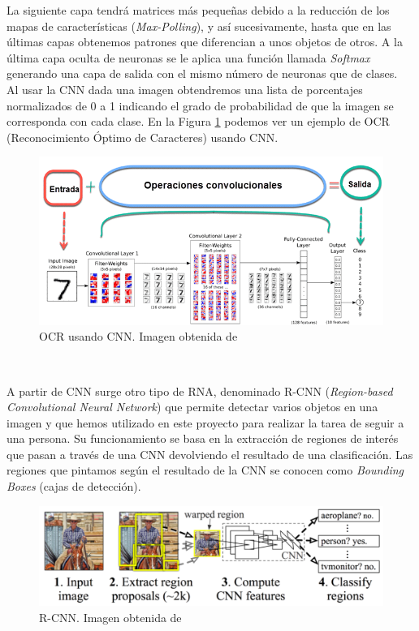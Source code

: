 La siguiente capa tendrá matrices más pequeñas debido a la reducción de los mapas de características (\textit{Max-Polling}), y así sucesivamente, hasta que en las últimas capas obtenemos patrones que diferencian a unos objetos de otros. A la última capa oculta de neuronas se le aplica una función llamada \textit{Softmax} generando una capa de salida con el mismo número de neuronas que de clases.\\

Al usar la CNN dada una imagen obtendremos una lista de porcentajes normalizados de 0 a 1 indicando el grado de probabilidad de que la imagen se corresponda con cada clase. En la Figura \ref{fig:ocr_cnn} podemos ver un ejemplo de OCR (Reconocimiento Óptimo de Caracteres) usando CNN.\\

\begin{figure}[H]
  \begin{center}
    \includegraphics[width=15cm]{imagenes/cap1/ocr-cnn.png}
  \end{center}
  \caption[OCR usando CNN]{OCR usando CNN. Imagen obtenida de \cite{dnn}}
  \label{fig:ocr_cnn}
\end{figure}\

A partir de CNN surge otro tipo de RNA, denominado R-CNN (\textit{Region-based Convolutional Neural Network}) que permite detectar varios objetos en una imagen y que hemos utilizado en este proyecto para realizar la tarea de seguir a una persona. Su funcionamiento se basa en la extracción de regiones de interés que pasan a través de una CNN devolviendo el resultado de una clasificación. Las regiones que pintamos según el resultado de la CNN se conocen como \textit{Bounding Boxes} (cajas de detección).

\begin{figure}[H]
  \begin{center}
    \includegraphics[width=15cm]{imagenes/cap1/r-cnn.png}
  \end{center}
  \caption[Ejemplo de R-CNN]{R-CNN. Imagen obtenida de \cite{r-cnn}}
  \label{fig:r-cnn}
\end{figure}\

